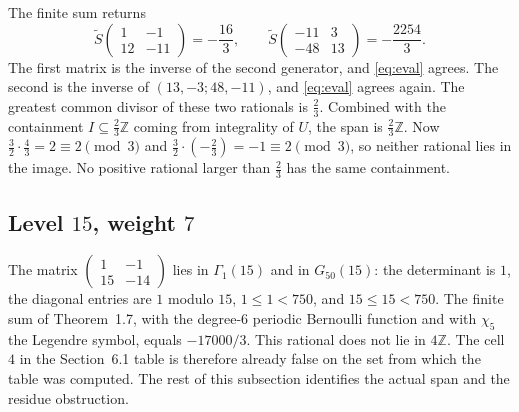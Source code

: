 \documentclass[11pt]{article}
\theoremstyle{remark}
\newcommand{\tS}{\widetilde{S}}
\newcommand{\Z}{\mathbb{Z}}
\begin{document}
The finite sum returns
\[
\tS\begin{pmatrix}1&-1\\12&-11\end{pmatrix}=-\frac{16}{3},
\qquad
\tS\begin{pmatrix}-11&3\\-48&13\end{pmatrix}=-\frac{2254}{3}.
\]
The first matrix is the inverse of the second generator, and \eqref{eq:eval} agrees.
The second is the inverse of \((13,-3;48,-11)\), and \eqref{eq:eval} agrees again.
The greatest common divisor of these two rationals is \(\tfrac23\).
Combined with the containment \(I\subseteq\tfrac23\Z\) coming from integrality of \(U\), the span is \(\tfrac23\Z\).
Now \(\tfrac32\cdot\tfrac43=2\equiv 2\pmod{3}\) and \(\tfrac32\cdot(-\tfrac23)=-1\equiv 2\pmod{3}\), so neither rational lies in the image.
No positive rational larger than \(\tfrac23\) has the same containment.

\subsection{Level \(15\), weight \(7\)}
\label{sec:15}

The matrix \(\begin{pmatrix}1&-1\\15&-14\end{pmatrix}\) lies in \(\Gamma_1(15)\) and in \(G_{50}(15)\): the determinant is \(1\), the diagonal entries are \(1\) modulo \(15\), \(1\le 1<750\), and \(15\le 15<750\).
The finite sum of Theorem~1.7, with the degree-\(6\) periodic Bernoulli function and with \(\chi_5\) the Legendre symbol, equals \(-17000/3\).
This rational does not lie in \(4\Z\).
The cell \(4\) in the Section~6.1 table is therefore already false on the set from which the table was computed.
The rest of this subsection identifies the actual span and the residue obstruction.
\end{document}
